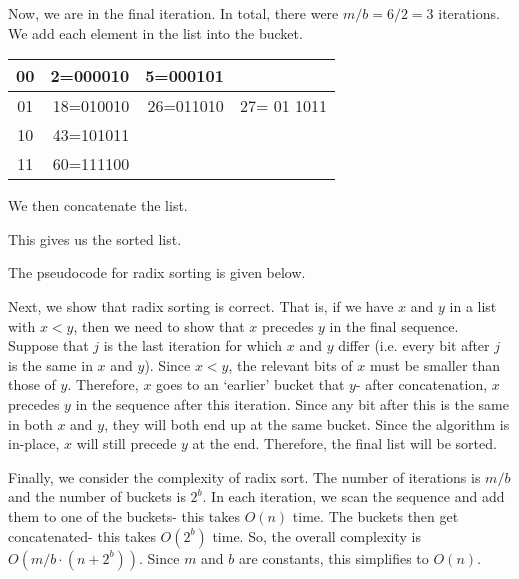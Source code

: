 \documentclass[a4paper, openany]{memoir}
\begin{document}
\noindent Now, we are in the final iteration. In total, there were $m/b = 6/2 = 3$ iterations. We add each element in the list into the bucket.
\begin{table}[H]
    \centering
    \begin{tabular}{c|rrr}
        00 & 2={\color{red}00}0010 & 5={\color{red}00}0101 \\
        \hline
        01 & 18={\color{red}01}0010 & 26={\color{red}01}1010 & 27= {\color{red}01} 1011 \\
        \hline
        10 & 43={\color{red}10}1011 \\
        \hline
        11 & 60={\color{red}11}1100
    \end{tabular}
\end{table}
\noindent We then concatenate the list.
\begin{figure}[H]
    \centering
\end{figure}
\noindent This gives us the sorted list.

The pseudocode for radix sorting is given below.


Next, we show that radix sorting is correct. That is, if we have $x$ and $y$ in a list with $x < y$, then we need to show that $x$ precedes $y$ in the final sequence. Suppose that $j$ is the last iteration for which $x$ and $y$ differ (i.e. every bit after $j$ is the same in $x$ and $y$). Since $x < y$, the relevant bits of $x$ must be smaller than those of $y$. Therefore, $x$ goes to an `earlier' bucket that $y$- after concatenation, $x$ precedes $y$ in the sequence after this iteration. Since any bit after this is the same in both $x$ and $y$, they will both end up at the same bucket. Since the algorithm is in-place, $x$ will still precede $y$ at the end. Therefore, the final list will be sorted.

Finally, we consider the complexity of radix sort. The number of iterations is $m/b$ and the number of buckets is $2^b$. In each iteration, we scan the sequence and add them to one of the buckets- this takes $O(n)$ time. The buckets then get concatenated- this takes $O(2^b)$ time. So, the overall complexity is $O(m/b \cdot (n + 2^b))$. Since $m$ and $b$ are constants, this simplifies to $O(n)$.
\end{document}
